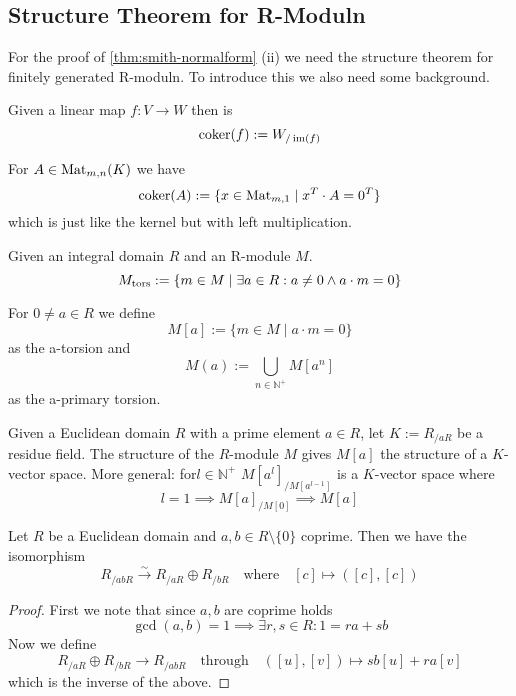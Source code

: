 \subsection{Structure Theorem for R-Moduln}
For the proof of \cref{thm:smith-normalform} (ii) we need the structure theorem for finitely generated R-moduln.
To introduce this we also need some background.

\begin{definition}[Cokernel]
   Given a linear map \(f: V \to W\) then is
   \[\operatorname{coker}(f) := W_{/\operatorname{im}(f)}\]
\end{definition}
\begin{remark}
   For \(A \in \operatorname{Mat}_{m, n}(K)\) we have
   \[\operatorname{coker}(A) := \{x \in \operatorname{Mat}_{m, 1} \mid x^T \cdot A = 0^T\}\]
   which is just like the kernel but with left multiplication.
\end{remark}

\begin{definition}[Torsion]
   Given an integral domain \(R\) and an R-module \(M\).
   \[M_{\operatorname{tors}} := \{m \in M \mid \exists a \in R: a \neq 0 \land a \cdot m = 0\}\]
\end{definition}
\begin{remark}
   For \(0 \neq a \in R\) we define
   \[M[a] := \{m \in M \mid a \cdot m = 0\}\]
   as the a-torsion and
   \[M(a) := \bigcup_{n \in \mathbb{N}^+} M[a^n]\]
   as the a-primary torsion.

   Given a Euclidean domain \(R\) with a prime element \(a \in R\), let \(K := R_{/aR}\) be a residue field.
   The structure of the \(R\)-module \(M\) gives \(M[a]\) the structure of a \(K\)-vector space.
   More general: for\(l \in \mathbb{N}^+\) \(M[a^l]_{/M[a^{l-1}]}\) is a \(K\)-vector space where
   \[l = 1 \implies M[a]_{/M[0]} \implies M[a]\]
\end{remark}

\begin{lemma}\label{lem:chin_remainder}
   Let \(R\) be a Euclidean domain and \(a, b \in R \setminus \{0\}\) coprime.
   Then we have the isomorphism
   \[R_{/abR} \xrightarrow{\sim} R_{/aR} \oplus R_{/bR} \quad\text{where}\quad [c] \mapsto ([c], [c])\]
\end{lemma}
\begin{proof}
   First we note that since \(a, b\) are coprime holds
   \[\gcd(a, b) = 1 \implies \exists r, s \in R: 1 = ra + sb\]
   Now we define
   \[R_{/aR} \oplus R_{/bR} \to R_{/abR} \quad\text{through}\quad ([u], [v]) \mapsto sb[u] + ra[v]\]
   which is the inverse of the above.
\end{proof}

